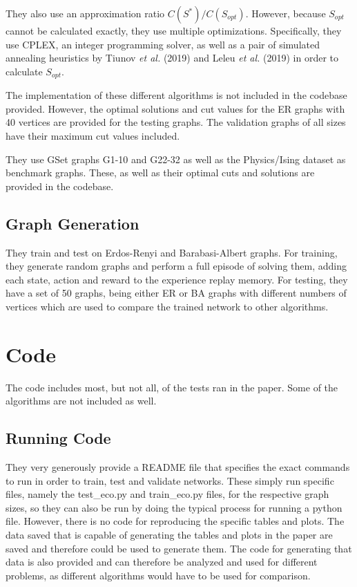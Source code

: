 \documentclass{article}
\begin{document}
They also use an approximation ratio $C(S^*)/C(S_{opt})$. However, because $S_{opt}$ cannot be calculated exactly, they use multiple optimizations. Specifically, they use CPLEX, an integer programming solver, as well as a pair of simulated annealing heuristics by Tiunov \textit{et al.} (2019) and Leleu \textit{et al.} (2019) in order to calculate $S_{opt}$. 

The implementation of these different algorithms is not included in the codebase provided. However, the optimal solutions and cut values for the ER graphs with 40 vertices are provided for the testing graphs. The validation graphs of all sizes have their maximum cut values included.

They use GSet graphs G1-10 and G22-32 as well as the Physics/Ising dataset as benchmark graphs. These, as well as their optimal cuts and solutions are provided in the codebase. 

\subsection{Graph Generation}\label{sec:eco-graph-gen}

They train and test on Erdos-Renyi \cite{erdos} and Barabasi-Albert \cite{albert} graphs. For training, they generate random graphs and perform a full episode of solving them, adding each state, action and reward to the experience replay memory. For testing, they have a set of 50 graphs, being either ER or BA graphs with different numbers of vertices which are used to compare the trained network to other algorithms. 

\section{Code}\label{sec:eco-code}

The code includes most, but not all, of the tests ran in the paper. Some of the algorithms are not included as well.

\subsection{Running Code}\label{sec:eco-running}

They very generously provide a README file that specifies the exact commands to run in order to train, test and validate networks. These simply run specific files, namely the test\_eco.py and train\_eco.py files, for the respective graph sizes, so they can also be run by doing the typical process for running a python file. However, there is no code for reproducing the specific tables and plots. The data saved that is capable of generating the tables and plots in the paper are saved and therefore could be used to generate them. The code for generating that data is also provided and can therefore be analyzed and used for different problems, as different algorithms would have to be used for comparison.
\end{document}
